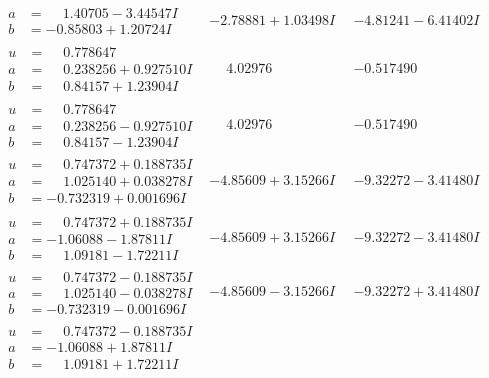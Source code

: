 \documentclass[1p]{elsarticle_modified}
\theoremstyle{definition}
\begin{document}
$$\begin{array}{c|c|c}
\begin{aligned}
a &= \phantom{-}1.40705 - 3.44547 I \\
b &= -0.85803 + 1.20724 I\end{aligned}
 & -2.78881 + 1.03498 I & -4.81241 - 6.41402 I \\ \hline\begin{aligned}
u &= \phantom{-}0.778647\phantom{ +0.000000I} \\
a &= \phantom{-}0.238256 + 0.927510 I \\
b &= \phantom{-}0.84157 + 1.23904 I\end{aligned}
 & \phantom{-}4.02976\phantom{ +0.000000I} & -0.517490\phantom{ +0.000000I} \\ \hline\begin{aligned}
u &= \phantom{-}0.778647\phantom{ +0.000000I} \\
a &= \phantom{-}0.238256 - 0.927510 I \\
b &= \phantom{-}0.84157 - 1.23904 I\end{aligned}
 & \phantom{-}4.02976\phantom{ +0.000000I} & -0.517490\phantom{ +0.000000I} \\ \hline\begin{aligned}
u &= \phantom{-}0.747372 + 0.188735 I \\
a &= \phantom{-}1.025140 + 0.038278 I \\
b &= -0.732319 + 0.001696 I\end{aligned}
 & -4.85609 + 3.15266 I & -9.32272 - 3.41480 I \\ \hline\begin{aligned}
u &= \phantom{-}0.747372 + 0.188735 I \\
a &= -1.06088 - 1.87811 I \\
b &= \phantom{-}1.09181 - 1.72211 I\end{aligned}
 & -4.85609 + 3.15266 I & -9.32272 - 3.41480 I \\ \hline\begin{aligned}
u &= \phantom{-}0.747372 - 0.188735 I \\
a &= \phantom{-}1.025140 - 0.038278 I \\
b &= -0.732319 - 0.001696 I\end{aligned}
 & -4.85609 - 3.15266 I & -9.32272 + 3.41480 I \\ \hline\begin{aligned}
u &= \phantom{-}0.747372 - 0.188735 I \\
a &= -1.06088 + 1.87811 I \\
b &= \phantom{-}1.09181 + 1.72211 I\end{aligned}

\end{array}$$
\end{document}
